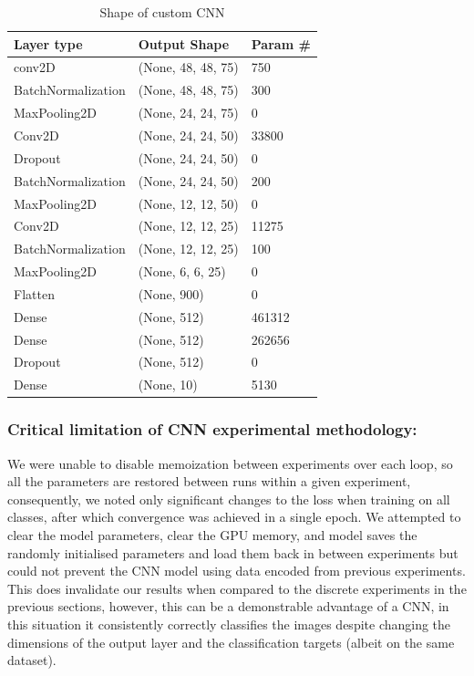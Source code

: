 \documentclass[11pt]{article}
\begin{document}
  \begin{table}[h]\caption {Shape of custom CNN}
    \centering
    \begin{tabular}{@{}lll@{}} 
    \toprule
    Layer type & Output Shape & Param \# \\ \midrule
    conv2D & (None, 48, 48, 75) & 750 \\ \midrule
    BatchNormalization & (None, 48, 48, 75) & 300 \\ \midrule
    MaxPooling2D & (None, 24, 24, 75) & 0 \\ \midrule
    Conv2D & (None, 24, 24, 50) & 33800 \\ \midrule
    Dropout & (None, 24, 24, 50) & 0 \\ \midrule
    BatchNormalization & (None, 24, 24, 50) & 200 \\ \midrule
    MaxPooling2D & (None, 12, 12, 50) & 0 \\ \midrule
    Conv2D & (None, 12, 12, 25) & 11275 \\ \midrule
    BatchNormalization & (None, 12, 12, 25) & 100 \\ \midrule
    MaxPooling2D & (None, 6, 6, 25) & 0 \\ \midrule
    Flatten & (None, 900) & 0 \\ \midrule
    Dense & (None, 512) & 461312 \\ \midrule
    Dense & (None, 512) & 262656 \\ \midrule
    Dropout & (None, 512) & 0 \\ \midrule
    Dense & (None, 10) & 5130 \\ \bottomrule
    \end{tabular}
  \end{table}


\subsubsection{Critical limitation of CNN experimental methodology:}
We were unable to disable memoization between experiments over each loop, so all the parameters are restored between runs within a given experiment, consequently, we noted only significant changes to the loss when training on all classes, after which convergence was achieved in a single epoch. We attempted to clear the model parameters, clear the GPU memory, and model saves the randomly initialised parameters and load them back in between experiments but could not prevent the CNN model using data encoded from previous experiments. This does invalidate our results when compared to the discrete experiments in the previous sections, however, this can be a demonstrable advantage of a CNN, in this situation it consistently correctly classifies the images despite changing the dimensions of the output layer and the classification targets (albeit on the same dataset).
\end{document}
